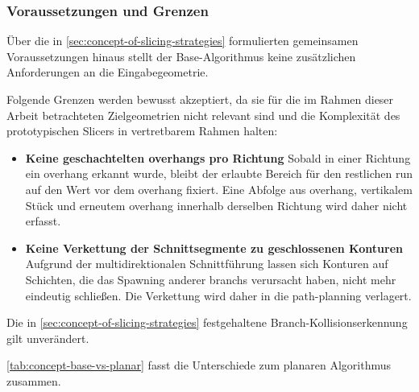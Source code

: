             \subsubsection{Voraussetzungen und Grenzen}\label{subsubsec:concept-base-assumptions-limits}
                Über die in \cref{sec:concept-of-slicing-strategies} formulierten gemeinsamen Voraussetzungen hinaus stellt der Base-Algorithmus keine zusätzlichen Anforderungen an die Eingabegeometrie.

                Folgende Grenzen werden bewusst akzeptiert, da sie für die im Rahmen dieser Arbeit betrachteten Zielgeometrien nicht relevant sind und die Komplexität des prototypischen Slicers in vertretbarem Rahmen halten:

                \begin{itemize}
                    \item \textbf{Keine geschachtelten \glspl{overhang} pro Richtung}
                        Sobald in einer Richtung ein \gls{overhang} erkannt wurde, bleibt der erlaubte Bereich für den restlichen \gls{run} auf den Wert vor dem \gls{overhang} fixiert.
                        Eine Abfolge aus \gls{overhang}, vertikalem Stück und erneutem \gls{overhang} innerhalb derselben Richtung wird daher nicht erfasst.
                    \item \textbf{Keine Verkettung der Schnittsegmente zu geschlossenen Konturen}
                        Aufgrund der multidirektionalen Schnittführung lassen sich Konturen auf Schichten, die das Spawning anderer \glspl{branch} verursacht haben, nicht mehr eindeutig schließen.
                        Die Verkettung wird daher in die \gls{path-planning} verlagert.
                \end{itemize}

                Die in \cref{sec:concept-of-slicing-strategies} festgehaltene Branch-Kollisionserkennung gilt unverändert.

                \cref{tab:concept-base-vs-planar} fasst die Unterschiede zum planaren Algorithmus zusammen.

